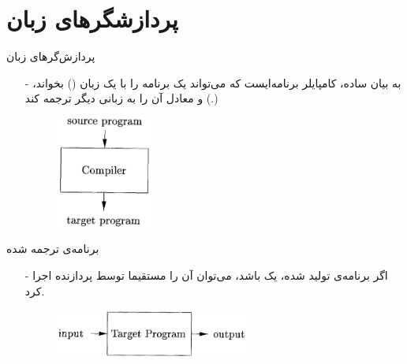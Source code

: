 \section{پردازشگر‌های زبان}
\begin{frame}[fragile]{پردازش‌گر‌های زبان}
\begin{itemize}\itemr
\item[-]
به بیان ساده، کامپایلر برنامه‌ایست که می‌تواند یک برنامه را با یک زبان () بخواند، و معادل آن را به زبانی دیگر ترجمه کند  (.)
\vspace{5mm}
\begin{figure}[H]
\begin{center}
\includegraphics[width=0.3\textwidth, height=0.6\textheight, angle=1]{docs/images/sct}
\end{center}
\end{figure}
\end{itemize}
\end{frame}

\begin{frame}{برنامه‌ی ترجمه شده}
\begin{itemize}\itemr
\item[-]
اگر برنامه‌ی تولید شده، یک 
باشد، می‌توان آن را مستقیما توسط پردازنده اجرا کرد.
\vspace{5mm}
\begin{figure}[H]
\begin{center}
\includegraphics[width=0.6\textwidth, height=0.3\textheight, angle=0.5]{docs/images/executable}
\end{center}
\end{figure}
\end{itemize}
\end{frame}